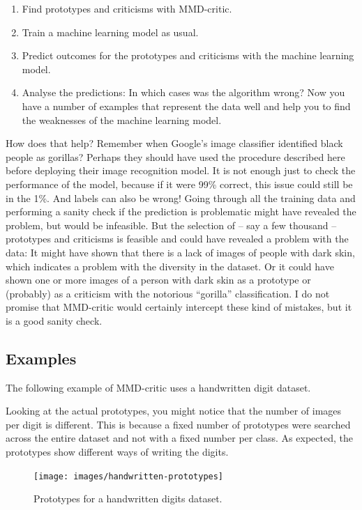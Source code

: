 \documentclass[
  11pt,
]{scrbook}
\providecommand{\tightlist}{%
  \setlength{\itemsep}{0pt}\setlength{\parskip}{0pt}}
\begin{document}
\begin{enumerate}
\def\labelenumi{\arabic{enumi}.}
\tightlist
\item
  Find prototypes and criticisms with MMD-critic.
\item
  Train a machine learning model as usual.
\item
  Predict outcomes for the prototypes and criticisms with the machine learning model.
\item
  Analyse the predictions: In which cases was the algorithm wrong?
  Now you have a number of examples that represent the data well and help you to find the weaknesses of the machine learning model.
\end{enumerate}

How does that help?
Remember when Google's image classifier identified black people as gorillas?
Perhaps they should have used the procedure described here before deploying their image recognition model.
It is not enough just to check the performance of the model, because if it were 99\% correct, this issue could still be in the 1\%.
And labels can also be wrong!
Going through all the training data and performing a sanity check if the prediction is problematic might have revealed the problem, but would be infeasible.
But the selection of -- say a few thousand -- prototypes and criticisms is feasible and could have revealed a problem with the data:
It might have shown that there is a lack of images of people with dark skin, which indicates a problem with the diversity in the dataset.
Or it could have shown one or more images of a person with dark skin as a prototype or (probably) as a criticism with the notorious ``gorilla'' classification.
I do not promise that MMD-critic would certainly intercept these kind of mistakes, but it is a good sanity check.

\hypertarget{examples-3}{%
\subsection{Examples}\label{examples-3}}

The following example of MMD-critic uses a handwritten digit dataset.

Looking at the actual prototypes, you might notice that the number of images per digit is different.
This is because a fixed number of prototypes were searched across the entire dataset and not with a fixed number per class.
As expected, the prototypes show different ways of writing the digits.

\begin{figure}

{\centering \texttt{[image: images/handwritten-prototypes]} 

}

\caption{Prototypes for a handwritten digits dataset.}\label{fig:prototypes-and-criticisms2}
\end{figure}
\end{document}
